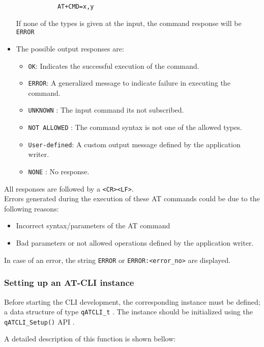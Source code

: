 \begin{itemize}
\begin{itemize}
        \begin{lstlisting}
        AT+CMD=x,y
        \end{lstlisting}
    \end{itemize}
    If none of the types is given at the input, the command response will be \lstinline{ERROR}
    \item The possible output responses are:
    \begin{itemize}
        \item \lstinline{OK}: Indicates the successful execution of the command.
        \item \lstinline{ERROR}: A generalized message to indicate failure in executing the command. 
        \item \lstinline{UNKNOWN} : The input command its not subscribed.
        \item \lstinline{NOT ALLOWED} : The command syntax is not one of the allowed types.
        \item \lstinline{User-defined}: A custom output message defined by the application writer.
        \item \lstinline{NONE} : No response.
    \end{itemize}
\end{itemize}

All responses are followed by a \lstinline{<CR><LF>}. \\

Errors generated during the execution of these AT commands could be due to the following reasons:
\begin{itemize}
    \item Incorrect syntax/parameters of the AT command
    \item Bad parameters or not allowed operations defined by the application writer.
\end{itemize}

In case of an error, the string \lstinline{ERROR} or \lstinline{ERROR:<error_no>} are displayed.

\subsubsection{Setting up an AT-CLI instance}
Before starting the CLI development, the corresponding instance must be defined; a data structure of type \lstinline{qATCLI_t} . 
The instance should be initialized using the \lstinline{qATCLI_Setup()} API .

A detailed description of this function is shown bellow:  \\

